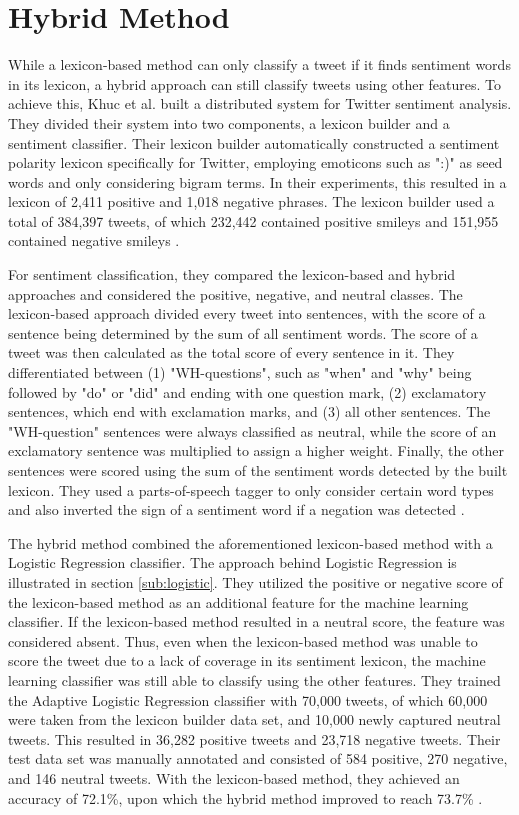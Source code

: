 \section{Hybrid Method}
While a lexicon-based method can only classify a tweet if it finds sentiment words in its lexicon, a hybrid approach can still classify tweets using other features. To achieve this, Khuc et al. built a distributed system for Twitter sentiment analysis. They divided their system into two components, a lexicon builder and a sentiment classifier. Their lexicon builder automatically constructed a sentiment polarity lexicon specifically for Twitter, employing emoticons such as ":)" as seed words and only considering bigram terms. In their experiments, this resulted in a lexicon of 2,411 positive and 1,018 negative phrases. The lexicon builder used a total of 384,397 tweets, of which 232,442 contained positive smileys and 151,955 contained negative smileys \cite{khuc}.

For sentiment classification, they compared the lexicon-based and hybrid approaches and considered the positive, negative, and neutral classes. The lexicon-based approach divided every tweet into sentences, with the score of a sentence being determined by the sum of all sentiment words. The score of a tweet was then calculated as the total score of every sentence in it. They differentiated between (1) "WH-questions", such as "when" and "why" being followed by "do" or "did" and ending with one question mark, (2) exclamatory sentences, which end with exclamation marks, and (3) all other sentences. The "WH-question" sentences were always classified as neutral, while the score of an exclamatory sentence was multiplied to assign a higher weight. Finally, the other sentences were scored using the sum of the sentiment words detected by the built lexicon. They used a parts-of-speech tagger to only consider certain word types and also inverted the sign of a sentiment word if a negation was detected \cite{khuc}.

The hybrid method combined the aforementioned lexicon-based method with a Logistic Regression classifier. The approach behind Logistic Regression is illustrated in section \ref{sub:logistic}. They utilized the positive or negative score of the lexicon-based method as an additional feature for the machine learning classifier. If the lexicon-based method resulted in a neutral score, the feature was considered absent. Thus, even when the lexicon-based method was unable to score the tweet due to a lack of coverage in its sentiment lexicon, the machine learning classifier was still able to classify using the other features. They trained the Adaptive Logistic Regression classifier with 70,000 tweets, of which 60,000 were taken from the lexicon builder data set, and 10,000 newly captured neutral tweets. This resulted in 36,282 positive tweets and 23,718 negative tweets. Their test data set was manually annotated and consisted of 584 positive, 270 negative, and 146 neutral tweets. With the lexicon-based method, they achieved an accuracy of 72.1\%, upon which the hybrid method improved to reach 73.7\% \cite{khuc}.










